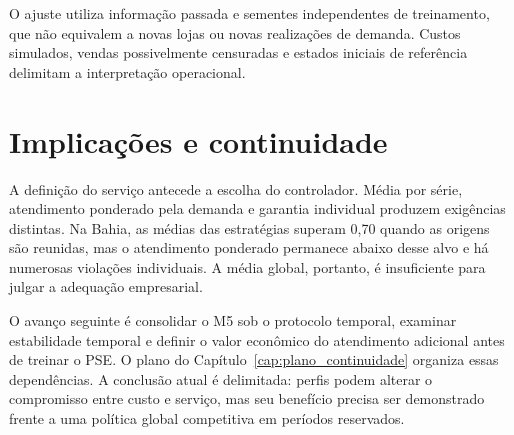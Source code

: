 O ajuste utiliza informação passada e sementes independentes de treinamento, que não equivalem a novas lojas ou novas realizações de demanda. Custos simulados, vendas possivelmente censuradas e estados iniciais de referência delimitam a interpretação operacional.

\section{Implicações e continuidade}

A definição do serviço antecede a escolha do controlador. Média por série, atendimento ponderado pela demanda e garantia individual produzem exigências distintas. Na Bahia, as médias das estratégias superam 0,70 quando as origens são reunidas, mas o atendimento ponderado permanece abaixo desse alvo e há numerosas violações individuais. A média global, portanto, é insuficiente para julgar a adequação empresarial.

O avanço seguinte é consolidar o M5 sob o protocolo temporal, examinar estabilidade temporal e definir o valor econômico do atendimento adicional antes de treinar o PSE. O plano do Capítulo~\ref{cap:plano_continuidade} organiza essas dependências. A conclusão atual é delimitada: perfis podem alterar o compromisso entre custo e serviço, mas seu benefício precisa ser demonstrado frente a uma política global competitiva em períodos reservados.
